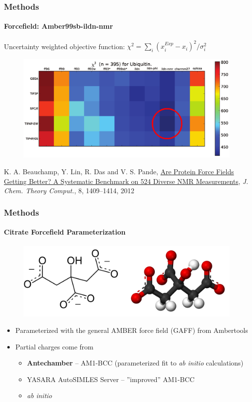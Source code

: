 \documentclass[english]{beamer}
\begin{document}
\begin{frame}
    \frametitle{Methods}
    \framesubtitle{Forcefield: Amber99sb-ildn-nmr}

    Uncertainty weighted objective function: $\chi^2 = \sum_i(x_i^{Exp} - x_i)^2 / \sigma_i^2$

    \begin{figure}
        \includegraphics[width=\linewidth]{figures/forcefield_performance.png}
    \end{figure}        

    \tiny
    K. A. Beauchamp, Y. Lin, R. Das and V. S. Pande,
    \href{http://pubs.acs.org/doi/abs/10.1021/ct2007814}
    {Are Protein Force Fields Getting Better?
    A Systematic Benchmark on 524 Diverse NMR Measurements},
    \textit{J. Chem. Theory Comput.},
    8, 1409--1414, 2012
    

\end{frame}   


\begin{frame}
    \frametitle{Methods}
    \framesubtitle{Citrate Forcefield Parameterization}

    \begin{figure}
        \includegraphics[width=.7\linewidth]{figures/citrate.png}
    \end{figure}      

    \begin{itemize}
        \item Parameterized with the general AMBER force field (GAFF) from Ambertools
        \item Partial charges come from
        \begin{itemize}
            \item \textbf{Antechamber} -- AM1-BCC (parameterized fit to \textit{ab initio} calculations)
            \item YASARA AutoSIMLES Server -- ''improved'' AM1-BCC
            \item \textit{ab initio}
        \end{itemize}
    \end{itemize}
\end{frame}   
 
\end{document}
